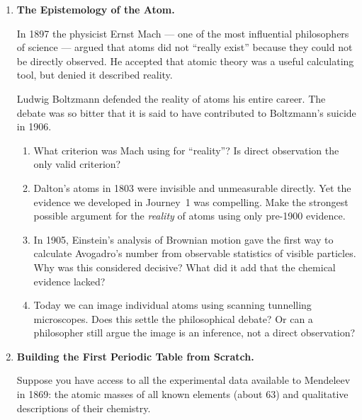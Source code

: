 \documentclass[12pt, a4paper]{book}
\theoremstyle{definition}
\begin{document}
\begin{deepbox}
\begin{enumerate}[label=\textbf{D\arabic*.}]

  \item \textbf{The Epistemology of the Atom.}

        In 1897 the physicist Ernst Mach --- one of the most
        influential philosophers of science --- argued that
        atoms did not ``really exist'' because they could
        not be directly observed.
        He accepted that atomic theory was a useful calculating
        tool, but denied it described reality.

        Ludwig Boltzmann defended the reality of atoms his entire career.
        The debate was so bitter that it is said to have contributed
        to Boltzmann's suicide in 1906.

        \begin{enumerate}[label=(\alph*)]
          \item What criterion was Mach using for ``reality''?
                Is direct observation the only valid criterion?

          \item Dalton's atoms in 1803 were invisible and
                unmeasurable directly.
                Yet the evidence we developed in Journey~1
                was compelling.
                Make the strongest possible argument for the
                \emph{reality} of atoms using only
                pre-1900 evidence.

          \item In 1905, Einstein's analysis of Brownian motion
                gave the first way to calculate Avogadro's number
                from observable statistics of visible particles.
                Why was this considered decisive?
                What did it add that the chemical evidence lacked?

          \item Today we can image individual atoms using
                scanning tunnelling microscopes.
                Does this settle the philosophical debate?
                Or can a philosopher still argue the image
                is an inference, not a direct observation?
        \end{enumerate}

  \item \textbf{Building the First Periodic Table from Scratch.}

        Suppose you have access to all the experimental data
        available to Mendeleev in 1869:
        the atomic masses of all known elements (about 63)
        and qualitative descriptions of their chemistry.


\end{enumerate}
\end{deepbox}
\end{document}
